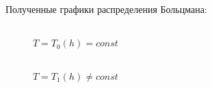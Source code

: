 Полученные графики распределения Больцмана:
\hspace{0pt}
\begin{figure}[H]
    \centering
    \begin{minipage}[h]{0.8\linewidth}
        \\
        $T=T_{0}(h)=const$
    \end{minipage}
    \vfill
    \vspace{6pt}
    \begin{minipage}[h]{0.8\linewidth}
        \\
        $T=T_{1}(h) \neq const$
    \end{minipage}
\end{figure}
